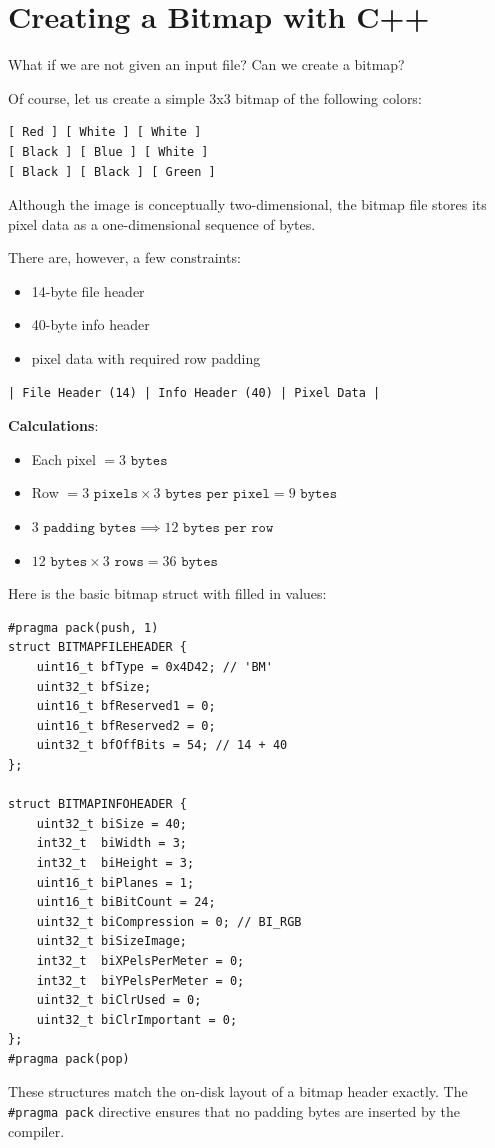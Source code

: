 \section{Creating a Bitmap with C++}

What if we are not given an input file? Can we create a bitmap?

Of course, let us create a simple 3x3 bitmap of the following colors:
\begin{verbatim}
[ Red ] [ White ] [ White ]
[ Black ] [ Blue ] [ White ]
[ Black ] [ Black ] [ Green ]
\end{verbatim}
Although the image is conceptually two-dimensional, the bitmap file stores its pixel data as a one-dimensional sequence of bytes.

There are, however, a few constraints:
\begin{itemize}
    \item 14-byte file header
    \item 40-byte info header 
    \item pixel data with required row padding
\end{itemize}
\begin{verbatim}
| File Header (14) | Info Header (40) | Pixel Data |
\end{verbatim}

\textbf{Calculations}:
\begin{itemize}
    \item Each pixel $= 3 \texttt{ bytes}$
    \item Row $= 3 \texttt{ pixels} \times 3 \texttt{ bytes per pixel} = 9 \texttt{ bytes}$
    \item  $3 \texttt{ padding bytes} \implies 12 \texttt{ bytes per row}$
    \item $12 \texttt{ bytes} \times 3 \texttt{ rows} = 36 \texttt{ bytes}$
\end{itemize}

Here is the basic bitmap struct with filled in values:
\begin{verbatim}
#pragma pack(push, 1)
struct BITMAPFILEHEADER {
    uint16_t bfType = 0x4D42; // 'BM'
    uint32_t bfSize;
    uint16_t bfReserved1 = 0;
    uint16_t bfReserved2 = 0;
    uint32_t bfOffBits = 54; // 14 + 40
};

struct BITMAPINFOHEADER {
    uint32_t biSize = 40;
    int32_t  biWidth = 3;
    int32_t  biHeight = 3;
    uint16_t biPlanes = 1;
    uint16_t biBitCount = 24;
    uint32_t biCompression = 0; // BI_RGB
    uint32_t biSizeImage;
    int32_t  biXPelsPerMeter = 0;
    int32_t  biYPelsPerMeter = 0;
    uint32_t biClrUsed = 0;
    uint32_t biClrImportant = 0;
};
#pragma pack(pop)
\end{verbatim}
These structures match the on-disk layout of a bitmap header exactly. The \texttt{\#pragma pack} directive ensures that no padding bytes are inserted by the compiler.


